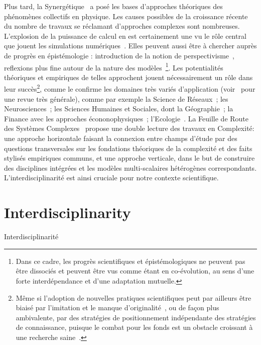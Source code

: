 {Plus tard, la Synergétique~\cite{haken1980synergetics} a posé les bases d'approches théoriques des phénomènes collectifs en physique. Les causes possibles de la croissance récente du nombre de travaux se réclamant d'approches complexes sont nombreuses. L'explosion de la puissance de calcul en est certainement une vu le rôle central que jouent les simulations numériques~\cite{varenne2010simulations}. Elles peuvent aussi être à chercher auprès de progrès en épistémologie : introduction de la notion de perspectivisme~\cite{giere2010scientific}, reflexions plus fine autour de la nature des modèles~\cite{varenne2013modeliser}\footnote{Dans ce cadre, les progrès scientifiques et épistémologiques ne peuvent pas être dissociés et peuvent être vus comme étant en co-évolution, au sens d'une forte interdépendance et d'une adaptation mutuelle.}. Les potentialités théoriques et empiriques de telles approchent jouent nécessairement un rôle dans leur succès\footnote{Même si l'adoption de nouvelles pratiques scientifiques peut par ailleurs être biaisé par l'imitation et le manque d'originalité~\cite{dirk1999measure}, ou de façon plus ambivalente, par des stratégies de positionnement indépendante des stratégies de connaissance, puisque le combat pour les fonds est un obstacle croissant à une recherche saine~\cite{bollen2014funding}.}, comme le confirme les domaines très variés d'application (voir~\cite{newman2011complex} pour une revue très générale), comme par exemple la Science de Réseaux~\cite{barabasi2002linked}; les Neurosciences~\cite{koch1999complexity}; les Sciences Humaines et Sociales,  dont la Géographie~\cite{manson2001simplifying}\cite{pumain1997pour}; la Finance avec les approches écononophysiques~\cite{stanley1999econophysics}; l'Ecologie~\cite{grimm2005pattern}. La Feuille de Route des Systèmes Complexes~\cite{2009arXiv0907.2221B} propose une double lecture des travaux en Complexité: une approche horizontale faisant la connexion entre champs d'étude par des questions transversales sur les fondations théoriques de la complexité et des faits stylisés empiriques communs, et une approche verticale, dans le but de construire des disciplines intégrées et les modèles multi-scalaires hétérogènes correspondants. L'interdisciplinarité est ainsi cruciale pour notre contexte scientifique.

}


\section*{Interdisciplinarity}{Interdisciplinarité}



